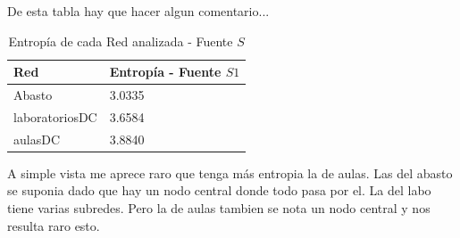 De esta tabla hay que hacer algun comentario...

\begin{table}[htb]
\begin{center}
\begin{tabular}{|l|l|}
\hline
Red & Entropía - Fuente $S1$  \\
\hline \hline
Abasto & 3.0335 \\ \hline
laboratoriosDC & 3.6584 \\ \hline
aulasDC & 3.8840  \\ \hline
\end{tabular}
\caption{Entropía de cada Red analizada - Fuente $S$}
\label{tabla informacion}
\end{center}
\end{table}
A simple vista me aprece raro que tenga más entropia la de aulas.
Las del abasto se suponia dado que hay un nodo central donde todo pasa por el.
La del labo tiene varias subredes. Pero la de aulas tambien se nota un nodo central y nos resulta raro esto.

